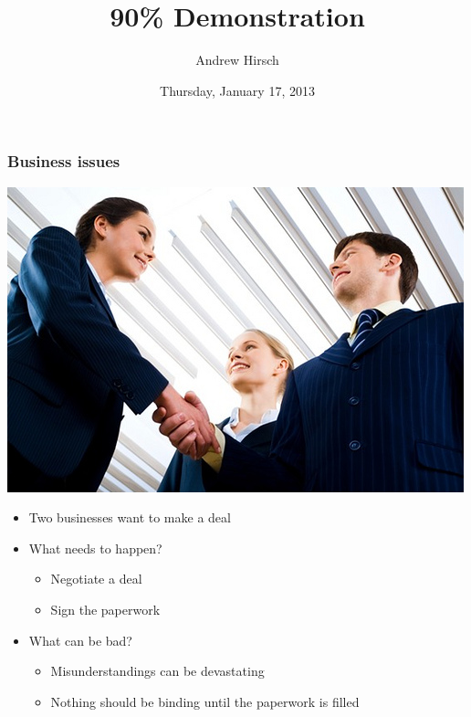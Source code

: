 \documentclass[bigger]{beamer}
\institute[GWU]{The George Washington University}
\title{90\% Demonstration}
\author{Andrew Hirsch}
\date{Thursday, January 17, 2013 }
\begin{document}
\maketitle


\begin{frame}
\frametitle{Business issues}
\label{sec-1}


\includegraphics[scale=0.25]{../pictures/business.jpg}

\begin{itemize}
\item Two businesses want to make a deal
\item What needs to happen?
\begin{itemize}
\item Negotiate a deal
\item Sign the paperwork
\end{itemize}
\item What can be bad?
\begin{itemize}
\item Misunderstandings can be devastating
\item Nothing should be binding until the paperwork is filled
\end{itemize}
\end{itemize}
\end{frame}
\end{document}
